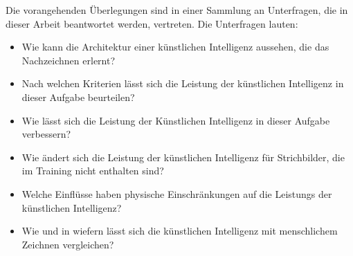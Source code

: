 Die vorangehenden Überlegungen sind in einer Sammlung an Unterfragen, die in
dieser Arbeit beantwortet werden, vertreten. Die Unterfragen lauten:
\begin{itemize}
    \item Wie kann die Architektur einer künstlichen Intelligenz aussehen, die das Nachzeichnen erlernt?
    \item Nach welchen Kriterien lässt sich die Leistung der künstlichen Intelligenz in dieser Aufgabe beurteilen?
    \item Wie lässt sich die Leistung der Künstlichen Intelligenz in dieser Aufgabe verbessern?
    \item Wie ändert sich die Leistung der künstlichen Intelligenz für Strichbilder, die im Training nicht enthalten sind?
    \item Welche Einflüsse haben physische Einschränkungen auf die Leistungs der künstlichen Intelligenz?
    \item Wie und in wiefern lässt sich die künstlichen Intelligenz mit menschlichem Zeichnen vergleichen?
\end{itemize}


